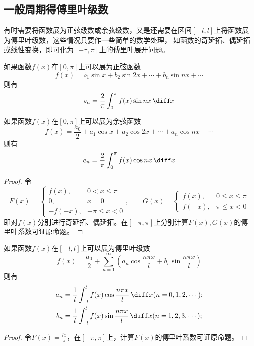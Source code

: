 \subsection{一般周期得傅里叶级数}
有时需要将函数展为正弦级数或余弦级数，又是还需要在区间$[-l,l]$上将函数展为傅里叶级数，这些情况只要作一些简单的数学处理，
如函数的奇延拓、偶延拓或线性变换，即可化为$[-\pi,\pi]$上的傅里叶展开问题。

\begin{theorem}
    如果函数$f(x)$在$[0,\pi]$上可以展为正弦函数
    \[ f(x) = b_1\sin x + b_2\sin 2x + \cdots + b_n \sin nx + \cdots \]
    则有
    \[ b_n = \frac{2}{\pi}\int_0^\pi f(x)\sin nx \,\diff x \]

    如果函数$f(x)$在$[0,\pi]$上可以展为余弦函数
    \[ f(x) = \frac{a_0}{2} + a_1\cos x + a_2\cos 2x + \cdots + a_n \cos nx + \cdots \]
    则有
    \[ a_n = \frac{2}{\pi}\int_0^\pi f(x)\cos nx \,\diff x \]
\end{theorem}
\begin{proof}
    令
    \[
        F(x) =
        \begin{cases}
            f(x),   & 0<x\leq\pi     \\
            0,      & x=0            \\
            -f(-x), & -\pi\leq x < 0
        \end{cases},
        \qquad
        G(x) =
        \begin{cases}
            f(x),  & 0\leq x \leq \pi \\
            f(-x), & \pi \leq x < 0
        \end{cases}
    \]
    即对$f(x)$分别进行奇延拓、偶延拓。在$[-\pi,\pi]$上分别计算$F(x),G(x)$的傅里叶系数可证原命题。
\end{proof}

\begin{theorem}
    如果函数$f(x)$在$[-l,l]$上可以展为傅里叶级数
    \[ f(x) = \frac{a_0}{2} + \sum_{n=1}^\infty(a_n\cos \frac{n\pi x}{l} + b_n\sin\frac{n\pi x}{l}) \]
    则有
    \begin{align*}
        a_n & = \frac{1}{l}\int_{-l}^l f(x)\cos\frac{n\pi x}{l}\,\diff x (n=0,1,2,\cdots); \\
        b_n & = \frac{1}{l}\int_{-l}^l f(x)\sin\frac{n\pi x}{l}\,\diff x (n=1,2,3,\cdots);
    \end{align*}
\end{theorem}
\begin{proof}
    令$F(x)=\frac{lx}{\pi}$，在$[-\pi,\pi]$上，计算$F(x)$的傅里叶系数可证原命题。
\end{proof}